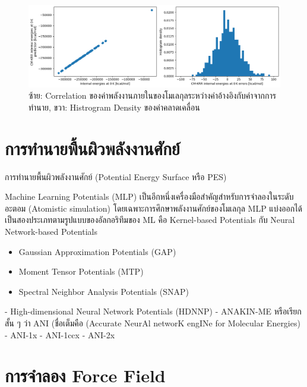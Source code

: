 \begin{figure}[H]
    \centering
    \includegraphics[width=\linewidth]{fig/qm9_cm_kernel_corr.png}
    \caption{ซ้าย: Correlation ของค่าพลังงานภายในของโมเลกุลระหว่างค่าอ้างอิงกับค่าจากการทำนาย, ขวา: Histrogram Density 
    ของค่าคลาดเคลื่อน}
    \label{fig:qm9_cm_kernel_mae}
\end{figure}

\section{การทำนายพื้นผิวพลังงานศักย์}
\label{sec:pred_pot_ener}

การทำนายพื้นผิวพลังงานศักย์ (Potential Energy Surface หรือ PES)

Machine Learning Potentials (MLP) เป็นอีกหนึ่งเครื่องมือสำคัญสำหรับการจำลองในระดับอะตอม (Atomistic simulation) 
โดยเฉพาะการศึกษาพลังงานศักย์ของโมเลกุล\autocite{behler2016,botu2017,brockherde2017,deringer2019,noe2020} 
MLP แบ่งออกได้เป็นสองประเภทตามรูปแบบของอัลกอริทึมของ ML คือ Kernel-based Potentials กับ Neural Network-based Potentials

\begin{itemize}
    \item Gaussian Approximation Potentials (GAP)\autocite{bartok2010}
    \item Moment Tensor Potentials (MTP)\autocite{shapeev2016}
    \item Spectral Neighbor Analysis Potentials (SNAP)\autocite{thompson2015}
\end{itemize}


- High-dimensional Neural Network Potentials (HDNNP)\autocite{behler2007}
- ANAKIN-ME หรือเรียกสั้น ๆ ว่า ANI (ชื่อเต็มคือ (Accurate NeurAl networK engINe for Molecular Energies)
    - ANI-1x\autocite{smith2017}
    - ANI-1ccx\autocite{smith2018}
    - ANI-2x\autocite{smith2019}

\section{การจำลอง Force Field}
\label{sec:model_ff}

